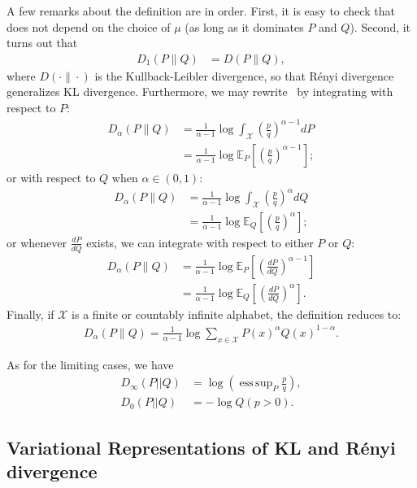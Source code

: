 \documentclass{article}
\numberwithin{theorem}{section}
\numberwithin{example}{section}
\numberwithin{remark}{section}
\numberwithin{definition}{section}
\newcommand{\E}{\mathbb{E}}
\DeclareMathOperator*{\esssup}{ess\,sup}
\newcommand{\X}{\mathcal{X}}
\newcommand{\ds}{\displaystyle}
\begin{document}
    
A few remarks about the definition are in order. First, it is easy to check that~ does not depend on the choice of $\mu$ (as long as it dominates $P$ and $Q$). Second, it turns out that
\begin{align} \label{eq:renyidiv-1=KL}
    D_1(P\|Q) & = D(P\|Q),
\end{align}
where $D(\cdot \| \cdot)$ is the Kullback-Leibler divergence, so that R\'enyi divergence generalizes KL divergence. 
Furthermore, we may rewrite~ by integrating with respect to $P$: 
\begin{align} \label{eq:renyidiv-wrtP}
    D_\alpha(P\|Q) &= \frac{1}{\alpha-1} \log \int_{\X} \left(\frac{p}{q} \right)^{\alpha-1} dP \\&= \frac{1}{\alpha-1} \log \E_P \left[ \left(\frac{p}{q} \right)^{\alpha-1} \right];
\end{align}
or with respect to $Q$ when $\alpha \in (0,1)$:
\begin{align}
    \label{eq:renyidiv-wrtQ}
     D_\alpha(P\|Q) &= \frac{1}{\alpha-1} \log \int_{\X} \left(\frac{p}{q} \right)^{\alpha} dQ\\ &= \frac{1}{\alpha-1} \log \E_Q \left[ \left(\frac{p}{q} \right)^{\alpha} \right];
\end{align}
or whenever $\ds \frac{dP}{dQ}$ exists, we can integrate with respect to either $P$ or $Q$:
\begin{align} \label{eq:renyidiv-PllQ}
    D_\alpha(P\|Q) &= \frac{1}{\alpha-1} \log \E_P \left[ \left( \frac{dP}{dQ} \right)^{\alpha-1} \right]\\ &= \frac{1}{\alpha-1} \log \E_Q \left[ \left( \frac{dP}{dQ} \right)^\alpha \right]. 
\end{align}
Finally, if $\X$ is a finite or countably infinite alphabet, the definition reduces to:
\begin{align}
    \label{eq:renyidiv-pmfs}
    D_\alpha(P\|Q) = \frac{1}{\alpha-1} \log \sum_{x \in \X} P(x)^\alpha Q(x)^{1-\alpha}.
\end{align}

As for the limiting cases, we have~\cite[Theorem 4, Theorem 6]{renyiDiv}
\begin{align}
    \label{eq:renyi-zero-inf}
    D_\infty(P||Q) & =  \log \left( \esssup_{P} \frac{p}{q} \right), \\
    D_0 (P||Q) & = - \log Q \left( p >0 \right). 
\end{align}



\subsection{Variational Representations of KL and R\'enyi divergence}
\end{document}
